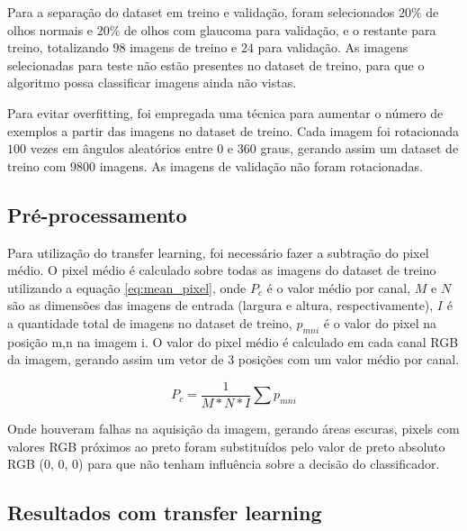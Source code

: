 \documentclass[conference]{IEEEtran}
\begin{document}
  Para a separação do dataset em treino e validação, foram selecionados $20\%$ de olhos normais e $20\%$ de olhos com glaucoma para validação, e o restante para treino, totalizando $98$ imagens de treino e $24$ para validação. As imagens selecionadas para teste não estão presentes no dataset de treino, para que o algoritmo possa classificar imagens ainda não vistas.

  Para evitar overfitting, foi empregada uma técnica para aumentar o número de exemplos a partir das imagens no dataset de treino. Cada imagem foi rotacionada $100$ vezes em ângulos aleatórios entre $0$ e $360$ graus, gerando assim um dataset de treino com $9800$ imagens. As imagens de validação não foram rotacionadas.

  \subsection{Pré-processamento}


  
  
  Para utilização do transfer learning, foi necessário fazer a subtração do pixel médio. O pixel médio é calculado sobre todas as imagens do dataset de treino utilizando a equação \ref{eq:mean_pixel}, onde $P_c$ é o valor médio por canal, $M$ e $N$ são as dimensões das imagens de entrada (largura e altura, respectivamente), $I$ é a quantidade total de imagens no dataset de treino, $p_{mni}$ é o valor do pixel na posição m,n na imagem i. O valor do pixel médio é calculado em cada canal RGB da imagem, gerando assim um vetor de 3 posições com um valor médio por canal.

  \begin{equation}
    P_c = \frac{1}{M * N * I} \sum p_{mni}
    \label{eq:mean_pixel}
  \end{equation}

  Onde houveram falhas na aquisição da imagem, gerando áreas escuras, pixels com valores RGB próximos ao preto foram substituídos pelo valor de preto absoluto RGB (0, 0, 0) para que não tenham influência sobre a decisão do classificador.

  \subsection{Resultados com transfer learning}
\end{document}
